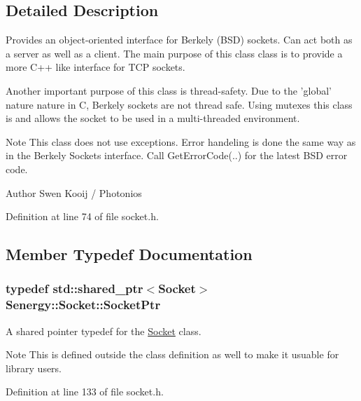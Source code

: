 \subsection{Detailed Description}
Provides an object-\/oriented interface for Berkely (B\-S\-D) sockets. Can act both as a server as well as a client. The main purpose of this class class is to provide a more C++ like interface for T\-C\-P sockets. 

Another important purpose of this class is thread-\/safety. Due to the 'global' nature nature in C, Berkely sockets are not thread safe. Using mutexes this class is and allows the socket to be used in a multi-\/threaded environment.

\begin{DoxyNote}{Note}
This class does not use exceptions. Error handeling is done the same way as in the Berkely Sockets interface. Call Get\-Error\-Code(..) for the latest B\-S\-D error code.
\end{DoxyNote}
\begin{DoxyAuthor}{Author}
Swen Kooij / Photonios 
\end{DoxyAuthor}


Definition at line 74 of file socket.\-h.



\subsection{Member Typedef Documentation}
\hypertarget{class_senergy_1_1_socket_ac9ff20ce80df2d0c2900cd0940ffe860}{
\subsubsection[{Socket\-Ptr}]{\setlength{\rightskip}{0pt plus 5cm}typedef std\-::shared\-\_\-ptr$<${\bf Socket}$>$ {\bf Senergy\-::\-Socket\-::\-Socket\-Ptr}}}\label{class_senergy_1_1_socket_ac9ff20ce80df2d0c2900cd0940ffe860}


A shared pointer typedef for the \hyperlink{class_senergy_1_1_socket}{Socket} class. 

\begin{DoxyNote}{Note}
This is defined outside the class definition as well to make it usuable for library users. 
\end{DoxyNote}


Definition at line 133 of file socket.\-h.



